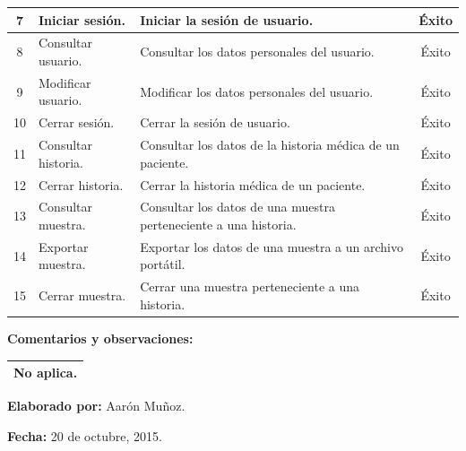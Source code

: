 {\begin{table}[h]
\begin{tabulary}{\anchotabla}{|c|L|J|c|}
			7 & Iniciar sesi\'{o}n. & Iniciar la sesi\'{o}n de usuario. & \'{E}xito \\ \hline
			
			8 & Consultar usuario. & Consultar los datos personales del usuario. & \'{E}xito \\ \hline
			
			9 & Modificar usuario. & Modificar los datos personales del usuario. & \'{E}xito \\ \hline
			
			10 & Cerrar sesi\'{o}n. & Cerrar la sesi\'{o}n de usuario. & \'{E}xito \\ \hline
			
			11 & Consultar historia. & Consultar los datos de la historia m\'{e}dica de un paciente. & \'{E}xito \\ \hline
			
			12 & Cerrar historia. & Cerrar la historia m\'{e}dica de un paciente. & \'{E}xito \\ \hline
			
			13 & Consultar muestra. & Consultar los datos de una muestra perteneciente a una historia. & \'{E}xito \\ \hline
			
			14 & Exportar muestra. & Exportar los datos de una muestra a un archivo port\'{a}til. & \'{E}xito \\ \hline
			
			15 & Cerrar muestra. & Cerrar una muestra perteneciente a una historia. & \'{E}xito \\ \hline

	\end{tabulary}
\end{table}
\newpage
\FloatBarrier
\textbf{Comentarios y observaciones:}
\begin{table}[H]
	\centering
	\setlength{\extrarowheight}{\altocelda}
	\begin{tabularx}{\anchotabla}{|X|}
		\hline
		No aplica.
		\\ \hline
	\end{tabularx}
\end{table}

\begin{minipage}[t]{0.45\textwidth}
	\begin{flushleft}
		\textbf{Elaborado por:} Aar\'{o}n Mu\~{n}oz.
	\end{flushleft}
\end{minipage}
\begin{minipage}[t]{0.45\textwidth}
	\begin{flushright}
		\begin{center}
			\textbf{Fecha:} 20 de octubre, 2015.
		\end{center}
	\end{flushright}
\end{minipage}
\vfill
\newpage
}
